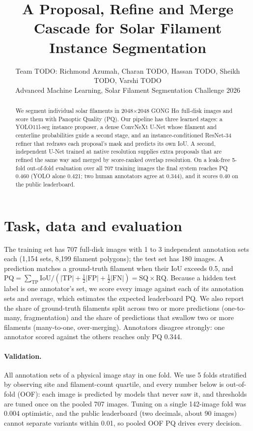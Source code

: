 \documentclass[10pt,twocolumn]{article}
\title{A Proposal, Refine and Merge Cascade for Solar Filament Instance Segmentation}
\author{Team TODO: Richmond Azumah, Charan TODO, Hassan TODO, Sheikh TODO, Varshi TODO\\
\small Advanced Machine Learning, Solar Filament Segmentation Challenge 2026}
\date{}
\begin{document}
\maketitle

\begin{abstract}
We segment individual solar filaments in 2048$\times$2048 GONG H$\alpha$ full-disk images and score them
with Panoptic Quality (PQ). Our pipeline has three learned stages: a YOLO11l-seg instance proposer, a
dense ConvNeXt U-Net whose filament and centerline probabilities guide a second stage, and an
instance-conditioned ResNet-34 refiner that redraws each proposal's mask and predicts its own IoU. A
second, independent U-Net trained at native resolution supplies extra proposals that are refined the
same way and merged by score-ranked overlap resolution. On a leak-free 5-fold out-of-fold evaluation
over all 707 training images the final system reaches PQ 0.460 (YOLO alone 0.421; two human
annotators agree at 0.344), and it scores 0.40 on the public leaderboard.
\end{abstract}

\section{Task, data and evaluation}
The training set has 707 full-disk images with 1 to 3 independent annotation sets each (1,154 sets,
8,199 filament polygons); the test set has 180 images. A prediction matches a ground-truth filament when
their IoU exceeds 0.5, and
$\mathrm{PQ}=\sum_{\mathrm{TP}}\mathrm{IoU}/(|\mathrm{TP}|+\tfrac12|\mathrm{FP}|+\tfrac12|\mathrm{FN}|)
=\mathrm{SQ}\times\mathrm{RQ}$.
Because a hidden test label is one annotator's set, we score every image against each of its annotation
sets and average, which estimates the expected leaderboard PQ. We also report the share of ground-truth
filaments split across two or more predictions (one-to-many, fragmentation) and the share of
predictions that swallow two or more filaments (many-to-one, over-merging). Annotators disagree
strongly: one annotator scored against the others reaches only PQ 0.344.

\paragraph{Validation.} All annotation sets of a physical image stay in one fold. We use 5 folds
stratified by observing site and filament-count quartile, and every number below is out-of-fold (OOF):
each image is predicted by models that never saw it, and thresholds are tuned once on the pooled 707
images. Tuning on a single 142-image fold was 0.004 optimistic, and the public leaderboard (two decimals,
about 90 images) cannot separate variants within 0.01, so pooled OOF PQ drives every decision.
\end{document}
